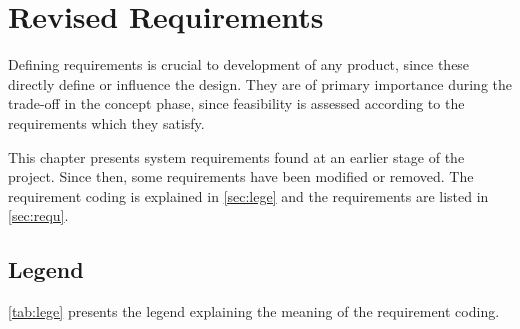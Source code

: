 \chapter{Revised Requirements}
\label{ch:requ}
\setlength{\parindent}{15pt}
Defining requirements is crucial to development of any product, since these directly define or influence the design. They are of primary importance during the trade-off in the concept phase, since feasibility is assessed according to the requirements which they satisfy.

This chapter presents system requirements found at an earlier stage of the project. Since then, some requirements have been modified or removed. %
The requirement coding is explained in \autoref{sec:lege} and the requirements are listed in \autoref{sec:requ}.  

\section{Legend}
\label{sec:lege}

\autoref{tab:lege} presents the legend explaining the meaning of the requirement coding.

